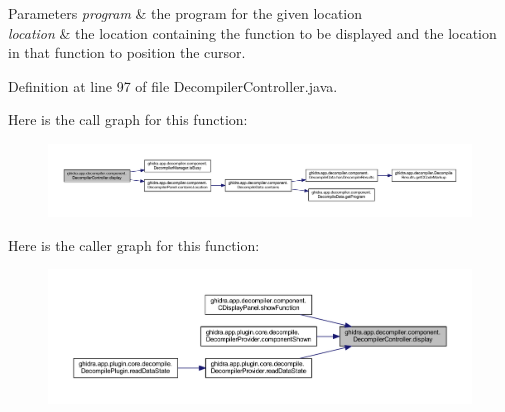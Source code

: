 \begin{DoxyParams}{Parameters}
{\em program} & the program for the given location \\
\hline
{\em location} & the location containing the function to be displayed and the location in that function to position the cursor. \\
\hline
\end{DoxyParams}


Definition at line 97 of file Decompiler\+Controller.\+java.

Here is the call graph for this function\+:
\nopagebreak
\begin{figure}[H]
\begin{center}
\leavevmode
\includegraphics[width=350pt]{classghidra_1_1app_1_1decompiler_1_1component_1_1_decompiler_controller_a1fe6c6e0f0652b4ae240ec90a9214612_cgraph}
\end{center}
\end{figure}
Here is the caller graph for this function\+:
\nopagebreak
\begin{figure}[H]
\begin{center}
\leavevmode
\includegraphics[width=350pt]{classghidra_1_1app_1_1decompiler_1_1component_1_1_decompiler_controller_a1fe6c6e0f0652b4ae240ec90a9214612_icgraph}
\end{center}
\end{figure}
\mbox{\label{classghidra_1_1app_1_1decompiler_1_1component_1_1_decompiler_controller_a630ed5b31dfc58f308580a98ca63fc65}} 
